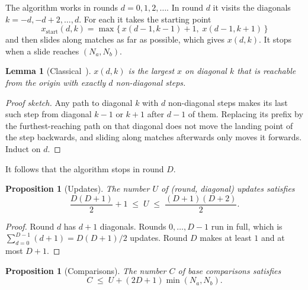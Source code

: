 \documentclass[11pt]{article}
\theoremstyle{plain}
\newtheorem{proposition}[theorem]{Proposition}
\newtheorem{lemma}[theorem]{Lemma}
\theoremstyle{definition}
\theoremstyle{remark}
\begin{document}
The algorithm works in rounds $d = 0, 1, 2, \dots$. In round $d$ it visits the
diagonals $k = -d, -d+2, \dots, d$. For each it takes the starting point
\begin{equation}\label{eq:start}
x_{\mathrm{start}}(d,k) = \max\bigl\{\, x(d-1,k-1) + 1,\; x(d-1,k+1) \,\bigr\}
\end{equation}
and then slides along matches as far as possible, which gives $x(d,k)$. It stops
when a slide reaches $(N_a, N_b)$.

\begin{lemma}[Classical~\cite{myers1986}]\label{lem:myers}
$x(d,k)$ is the largest $x$ on diagonal $k$ that is reachable from the origin
with exactly $d$ non-diagonal steps.
\end{lemma}

\begin{proof}[Proof sketch]
Any path to diagonal $k$ with $d$ non-diagonal steps makes its last such step
from diagonal $k-1$ or $k+1$ after $d-1$ of them. Replacing its prefix by the
furthest-reaching path on that diagonal does not move the landing point of the
step backwards, and sliding along matches afterwards only moves it forwards.
Induct on $d$.
\end{proof}

It follows that the algorithm stops in round $D$.

\begin{proposition}[Updates]\label{prop:updates}
The number $U$ of (round, diagonal) updates satisfies
\[
\frac{D(D+1)}{2} + 1 \;\le\; U \;\le\; \frac{(D+1)(D+2)}{2}.
\]
\end{proposition}

\begin{proof}
Round $d$ has $d + 1$ diagonals. Rounds $0, \dots, D-1$ run in full, which is
$\sum_{d=0}^{D-1}(d+1) = D(D+1)/2$ updates. Round $D$ makes at least $1$ and at
most $D + 1$.
\end{proof}

\begin{proposition}[Comparisons]\label{prop:compares}
The number $C$ of base comparisons satisfies
\[
C \;\le\; U + (2D+1)\min(N_a, N_b).
\]
\end{proposition}
\end{document}
